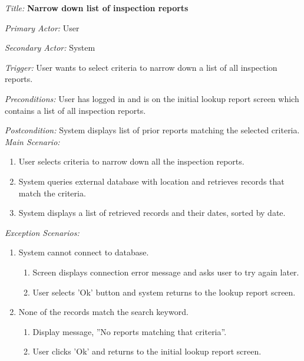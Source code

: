 \documentclass[twoside,letterpaper]{article}
\begin{document}
\textit{Title: }{\bfseries\color{black}Narrow down list of inspection reports}

{\color{black} \textit{Primary Actor:} User}

{\color{black} \textit{Secondary Actor:} System}

{\color{black} \textit{Trigger:} User wants to select criteria to narrow down a list of all inspection reports.}

{\color{black} \textit{Preconditions:} User has logged in and is on the initial lookup report screen which contains a list of all inspection reports.}

{\color{black} \textit{Postcondition:} System displays list of prior reports matching the selected criteria.}
\newline
{\color{black} \textit{Main Scenario:}}\
\begin{enumerate}
\item User selects criteria to narrow down all the inspection reports.
\item System queries external database with location and retrieves records that match the criteria.
\item System displays a list of retrieved records and their dates, sorted by date.
\end{enumerate}
{\color{black} \textit{Exception Scenarios:}}
\begin{enumerate}
\item System cannot connect to database.
\begin{enumerate}
\item Screen displays connection error message and asks user to try again later.
\item User selects 'Ok' button and system returns to the lookup report screen.
\end{enumerate}

\item None of the records match the search keyword.
\begin{enumerate}
\item Display message, ''No reports matching that criteria''.
\item User clicks 'Ok' and returns to the initial lookup report screen.
\end{enumerate}
\end{enumerate}
\end{document}
